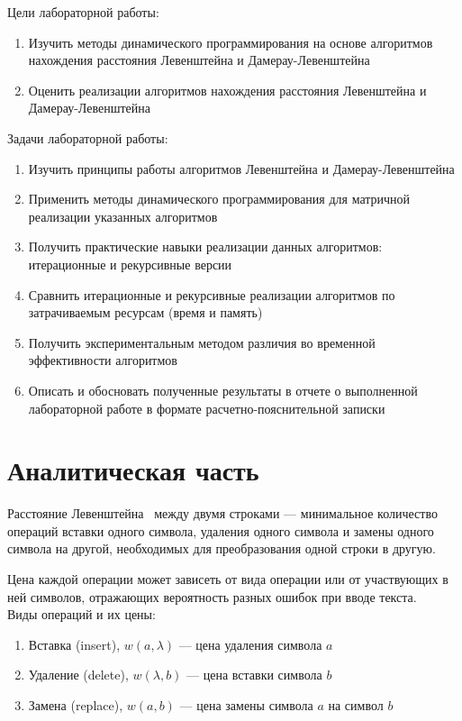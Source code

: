 \documentclass[12pt]{report}
\begin{document}
    Цели лабораторной работы:
    \begin{enumerate}
        \item Изучить методы динамического программирования на основе алгоритмов нахождения расстояния
        Левенштейна и Дамерау-Левенштейна
        \item Оценить реализации алгоритмов нахождения расстояния Левенштейна и Дамерау-Левенштейна
    \end{enumerate}

    Задачи лабораторной работы:
    \begin{enumerate}
        \item Изучить принципы работы алгоритмов Левенштейна и Дамерау-Левенштейна
        \item Применить методы динамического программирования для матричной реализации указанных алгоритмов
        \item Получить практические навыки реализации данных алгоритмов: итерационные и рекурсивные версии
        \item Сравнить итерационные и рекурсивные реализации алгоритмов по затрачиваемым ресурсам (время и память)
        \item Получить экспериментальным методом различия во временной эффективности алгоритмов
        \item Описать и обосновать полученные результаты в отчете о выполненной лабораторной работе
        в формате расчетно-пояснительной записки
    \end{enumerate}

    \newpage


    \chapter{Аналитическая часть}

    Расстояние Левенштейна~\cite{levenshtein} между двумя строками ---
    минимальное количество операций вставки одного символа, удаления одного символа
    и замены одного символа на другой, необходимых для преобразования одной строки в другую.

    Цена каждой операции может зависеть от вида операции или от участвующих в ней символов, отражающих вероятность
    разных ошибок при вводе текста.
    \\
    Виды операций и их цены:
    \begin{enumerate}
        \item Вставка (insert), $w(a,\lambda)$ --- цена удаления символа $a$
        \item Удаление (delete), $w(\lambda, b)$ --- цена вставки символа $b$
        \item Замена (replace), $w(a, b)$ --- цена замены символа $a$ на символ $b$
    \end{enumerate}
\end{document}
